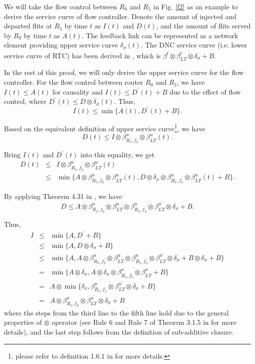\documentclass[10pt,journal]{IEEEtran}
\begin{document}
\begin{IEEEproof}
We will take the flow control between $R_9$ and $R_5$ in Fig. \ref{f2} as an example to derive the service curve of flow controller. Denote the amount of injected and departed flits at $R_5$ by time $t$ as $I(t)$ and $D(t)$, and the amount of flits served by $R_9$ by time $t$ as $A(t)$. The feedback link can be represented as a network element providing upper service curve $\delta_\sigma(t)$. The DNC service curve (i.e. lower service curve of RTC) has been derived in \cite{qian2009analysis}, which is $\overline{\beta^l\otimes\beta_{LT}^l\otimes\delta_{\sigma}+B}$.

In the rest of this proof, we will only derive the upper service curve for the flow controller. For the flow control between router $R_9$ and $R_5$, we have $I(t)\leq A(t)$ for causality and $I(t)\leq D^\prime(t)+B$ due to the effect of flow control, where $D^\prime(t)\leq D\otimes\delta_\sigma(t)$. Thus, $$I(t)\leq\min\{A(t),D^\prime(t)+B\}.$$

Based on the equivalent definition of upper service curve\footnote{please refer to definition 1.6.1 in \cite{Boudec2001Network} for more details.}, we have
$$D(t)\leq I\otimes \beta_{R_5,f_2}^u\otimes\beta_{LT}^u(t).$$

Bring $I(t)$ and $D^\prime(t)$ into this equality, we get
\begin{eqnarray*}
D(t)&\leq& I\otimes \beta_{R_5,f_2}^u\otimes\beta_{LT}^u(t)\\
&\leq& \min\{A\otimes \beta^u_{R_5,f_2}\otimes\beta_{LT}^u(t),D\otimes\delta_\sigma\otimes \beta_{R_5,f_2}^u\otimes\beta_{LT}^u(t)+B\}.
\end{eqnarray*}

By applying Theorem 4.31 in \cite{Boudec2001Network}, we have
$$D\leq A\otimes \beta^u_{R_5,f_2}\otimes\beta_{LT}^u\otimes\overline{\beta_{R_5,f_2}^u\otimes\beta_{LT}^u\otimes\delta_\sigma+B}.$$

Thus,
\begin{eqnarray*}
  I&\leq& \min\{A,D^\prime+B\}\\
  &\leq& \min\{A,D\otimes\delta_\sigma+B\}\\
  &\leq& \min\{A,A\otimes \beta^u_{R_5,f_2}\otimes\beta_{LT}^u\otimes\overline{\beta_{R_5,f_2}^u\otimes\beta_{LT}^u\otimes\delta_\sigma+B}\otimes\delta_\sigma+B\}\\
  &=& \min\{A\otimes \delta_\sigma,A\otimes \overline{\delta_\sigma\otimes\beta_{R_5,f_2}^u\otimes\beta_{LT}^u+B}\}\\
  &=& A\otimes\min\{\delta_\sigma,\overline{\beta_{R_5,f_2}^u\otimes\beta_{LT}^u\otimes\delta_\sigma+B}\}\\
  &=& A\otimes\overline{\beta_{R_5,f_2}^u\otimes\beta_{LT}^u\otimes\delta_\sigma+B}
\end{eqnarray*}
where the steps from the third line to the fifth line hold due to the general properties of $\otimes$ operator (see Rule 6 and Rule 7 of Theorem 3.1.5 in \cite{Boudec2001Network} for more details), and the last step follows from the definition of sub-additive closure.


\end{IEEEproof}
\end{document}
